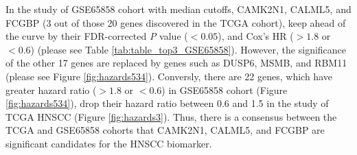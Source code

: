 \documentclass[jpm,article,submit,moreauthors,pdftex]{Definitions/mdpi}
\newenvironment{MyColorPar}[1]{%
    \leavevmode\color{#1}\ignorespaces%
}{%
}%
\begin{document}
\begin{MyColorPar}{red}
In the study of GSE65858 cohort with median cutoffs, CAMK2N1, CALML5, and FCGBP (3 out of those 20 genes discovered in the TCGA cohort), keep ahead of the curve by their FDR-corrected \textit{P} value ($< 0.05$), and Cox's HR ($> 1.8$ or $<0.6$) (please see Table \ref{tab:table_top3_GSE65858}).
However, the significance of the other 17 genes are replaced by genes such as DUSP6, MSMB, and RBM11 (please see Figure \ref{fig:hazards534}).
Conversly, there are 22 genes, which have greater hazard ratio ($> 1.8$ or $< 0.6$) in GSE65858 cohort (Figure \ref{fig:hazards534}), drop their hazard ratio between 0.6 and 1.5 in the study of TCGA HNSCC (Figure \ref{fig:hazards3}).
Thus, there is a consensus between the TCGA and GSE65858 cohorts that CAMK2N1, CALML5, and FCGBP are significant candidates for the HNSCC biomarker.
\end{MyColorPar} %



\end{document}
